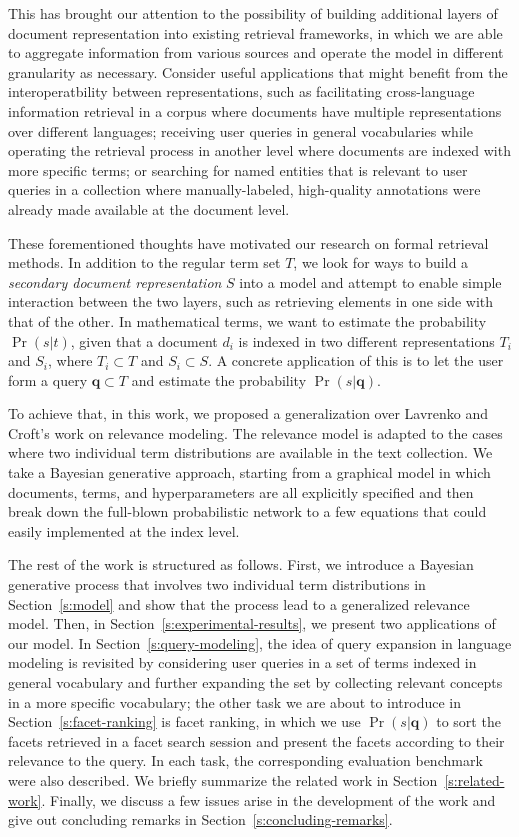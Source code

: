 This has brought our attention to the possibility of building additional layers
of document representation into existing retrieval frameworks, in which we are
able to aggregate information from various sources and operate the model in
different granularity as necessary.  Consider useful applications that might
benefit from the interoperatbility between representations, such as
facilitating cross-language information retrieval in a corpus where documents
have multiple representations over different languages; receiving user queries
in general vocabularies while operating the retrieval process in another level
where documents are indexed with more specific terms; or searching for named
entities that is relevant to user queries in a collection where
manually-labeled, high-quality annotations were already made available at the
document level.  

These forementioned thoughts have motivated our research on formal retrieval
methods.  In addition to the regular term set $T$, we look {for} ways to build
a {\it secondary document representation} $S$ into a model and attempt to
enable simple interaction between the two layers, such as retrieving elements
in one side with that of the other.  In mathematical terms, we want to estimate
the probability $\Pr(s|t)$, given that a document $d_i$ is indexed in two
different representations $T_i$ and $S_i$, where $T_i \subset T$ and $S_i
\subset S$.  A concrete application of this is to let the user form a query
$\mathbf{q} \subset T$ and estimate the probability $\Pr(s|\mathbf{q})$.

To achieve that, in this work, we proposed a generalization over Lavrenko and
Croft's work \cite{lavrenko2001relevance} on relevance modeling.  The relevance
model is adapted to the cases where two individual term distributions are
available in the text collection.  We take a Bayesian generative approach,
starting from a graphical model in which documents, terms, and hyperparameters
are all explicitly specified and then break down the full-blown
probabilistic network to a few equations that could easily implemented at the
index level.  

The rest of the work is structured as follows.  First, we introduce a Bayesian
generative process that involves two individual term distributions in
Section~\ref{s:model} and show that the process lead to a generalized relevance
model.  Then, in Section~\ref{s:experimental-results}, we present two
applications of our model.  In Section~\ref{s:query-modeling}, the idea of
query expansion in language modeling is revisited by considering user queries
in a set of terms indexed in general vocabulary and further expanding the set
by collecting relevant concepts in a more specific vocabulary; the other task
we are about to introduce in Section~\ref{s:facet-ranking} is facet ranking, in
which we use $\Pr(s|\mathbf{q})$ to sort the facets retrieved in a facet search
session and present the facets according to their relevance to the query.  In
each task, the corresponding evaluation benchmark were also described.  We
briefly summarize the related work in Section~\ref{s:related-work}.  Finally,
we discuss a few issues arise in the development of the work and give out
concluding remarks in Section~\ref{s:concluding-remarks}.

